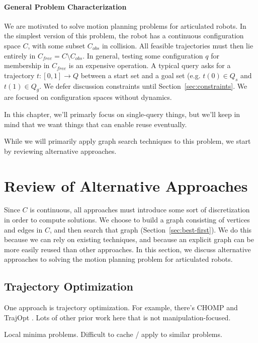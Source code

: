 \documentclass{report}
\begin{document}
\paragraph{General Problem Characterization}

We are motivated to solve motion planning problems for articulated robots.
In the simplest version of this problem,
the robot has a continuous configuration space $C$,
with some subset $C_{obs}$ in collision.
All feasible trajectories must then lie entirely in
$C_{free} = C \setminus C_{obs}$.
In general, testing some configuration $q$ for membership in $C_{free}$
is an expensive operation.
A typical query asks for a trajectory $t: [0,1] \rightarrow Q$ between
a start set and a goal set (e.g. $t(0) \in Q_s$ and $t(1) \in Q_g$.
We defer discussion constraints until Section~\ref{sec:constraints}.
We are focused on configuration spaces without dynamics.

In this chapter,
we'll primarly focus on single-query things,
but we'll keep in mind that we want things that can enable reuse eventually.

While we will primarily apply graph search techniques to this problem,
we start by reviewing alternative approaches.

\section{Review of Alternative Approaches}
\label{sec:related-work}

Since $C$ is continuous,
all approaches must introduce some sort of discretization
in order to compute solutions.
We choose to build a graph consisting of vertices and edges in $C$,
and then search that graph (Section~\ref{sec:best-first}).
We do this because we can rely on existing techniques,
and because an explicit graph can be more easily reused than other
approaches.
In this section, we discuss alternative approaches to solving
the motion planning problem for articulated robots.

\subsection{Trajectory Optimization}

One approach is trajectory optimization.
For example, there's CHOMP \cite{zucker2013chomp}
and TrajOpt \cite{schulman2013trajopt}.
Lots of other prior work here that is not manipulation-focused.

Local minima problems.
Difficult to cache / apply to similar problems.
\end{document}
